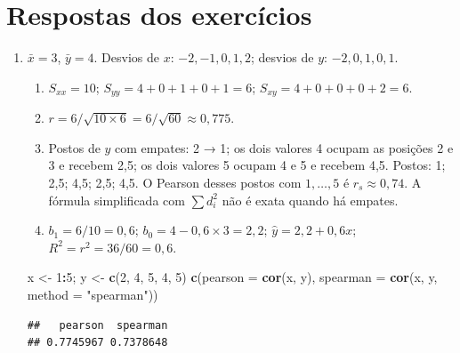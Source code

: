 \documentclass[
]{book}
\newenvironment{Shaded}{\begin{snugshade}}{\end{snugshade}}
\newcommand{\AttributeTok}[1]{\textcolor[rgb]{0.13,0.29,0.53}{#1}}
\newcommand{\DecValTok}[1]{\textcolor[rgb]{0.00,0.00,0.81}{#1}}
\newcommand{\FunctionTok}[1]{\textcolor[rgb]{0.13,0.29,0.53}{\textbf{#1}}}
\newcommand{\NormalTok}[1]{#1}
\newcommand{\OtherTok}[1]{\textcolor[rgb]{0.56,0.35,0.01}{#1}}
\newcommand{\SpecialCharTok}[1]{\textcolor[rgb]{0.81,0.36,0.00}{\textbf{#1}}}
\newcommand{\StringTok}[1]{\textcolor[rgb]{0.31,0.60,0.02}{#1}}
\providecommand{\tightlist}{%
  \setlength{\itemsep}{0pt}\setlength{\parskip}{0pt}}
\begin{document}
\section{Respostas dos exercícios}\label{respostas-dos-exercuxedcios-5}

\begin{enumerate}
\def\labelenumi{\arabic{enumi}.}
\item
  \(\bar{x} = 3\), \(\bar{y} = 4\). Desvios de \(x\): \(-2, -1, 0, 1, 2\); desvios de \(y\): \(-2, 0, 1, 0, 1\).

  \begin{enumerate}
  \def\labelenumii{\alph{enumii})}
  \tightlist
  \item
    \(S_{xx} = 10\); \(S_{yy} = 4 + 0 + 1 + 0 + 1 = 6\); \(S_{xy} = 4 + 0 + 0 + 0 + 2 = 6\).
  \item
    \(r = 6/\sqrt{10 \times 6} = 6/\sqrt{60} \approx 0{,}775\).
  \item
    Postos de \(y\) com empates: 2 → 1; os dois valores 4 ocupam as posições 2 e 3 e recebem 2,5; os dois valores 5 ocupam 4 e 5 e recebem 4,5. Postos: 1; 2,5; 4,5; 2,5; 4,5. O Pearson desses postos com \(1, \ldots, 5\) é \(r_s \approx 0{,}74\). A fórmula simplificada com \(\sum d_i^2\) não é exata quando há empates.
  \item
    \(b_1 = 6/10 = 0{,}6\); \(b_0 = 4 - 0{,}6 \times 3 = 2{,}2\); \(\hat{y} = 2{,}2 + 0{,}6x\); \(R^2 = r^2 = 36/60 = 0{,}6\).
  \end{enumerate}

\begin{Shaded}
\begin{Highlighting}[]
\NormalTok{x }\OtherTok{\textless{}{-}} \DecValTok{1}\SpecialCharTok{:}\DecValTok{5}\NormalTok{; y }\OtherTok{\textless{}{-}} \FunctionTok{c}\NormalTok{(}\DecValTok{2}\NormalTok{, }\DecValTok{4}\NormalTok{, }\DecValTok{5}\NormalTok{, }\DecValTok{4}\NormalTok{, }\DecValTok{5}\NormalTok{)}
\FunctionTok{c}\NormalTok{(}\AttributeTok{pearson =} \FunctionTok{cor}\NormalTok{(x, y), }\AttributeTok{spearman =} \FunctionTok{cor}\NormalTok{(x, y, }\AttributeTok{method =} \StringTok{"spearman"}\NormalTok{))}
\end{Highlighting}
\end{Shaded}

\begin{verbatim}
##   pearson  spearman 
## 0.7745967 0.7378648
\end{verbatim}

\begin{Shaded}
\end{Shaded}


\end{enumerate}
\end{document}
